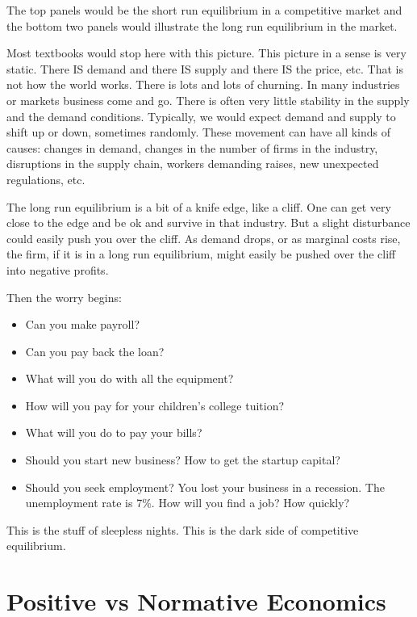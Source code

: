 \documentclass[
]{book}
\begin{document}
The top panels would be the short run equilibrium in a competitive market and the bottom two panels would illustrate the long run equilibrium in the market.

Most textbooks would stop here with this picture. This picture in a sense is very static. There IS demand and there IS supply and there IS the price, etc. That is not how the world works. There is lots and lots of churning. In many industries or markets business come and go. There is often very little stability in the supply and the demand conditions. Typically, we would expect demand and supply to shift up or down, sometimes randomly. These movement can have all kinds of causes: changes in demand, changes in the number of firms in the industry, disruptions in the supply chain, workers demanding raises, new unexpected regulations, etc.

The long run equilibrium is a bit of a knife edge, like a cliff. One can get very close to the edge and be ok and survive in that industry. But a slight disturbance could easily push you over the cliff. As demand drops, or as marginal costs rise, the firm, if it is in a long run equilibrium, might easily be pushed over the cliff into negative profits.

Then the worry begins:

\begin{itemize}
\item
  Can you make payroll?
\item
  Can you pay back the loan?
\item
  What will you do with all the equipment?
\item
  How will you pay for your children's college tuition?
\item
  What will you do to pay your bills?
\item
  Should you start new business? How to get the startup capital?
\item
  Should you seek employment? You lost your business in a recession. The unemployment rate is 7\%. How will you find a job? How quickly?
\end{itemize}

This is the stuff of sleepless nights. This is the dark side of competitive equilibrium.

\hypertarget{positive-vs-normative-economics}{%
\section{Positive vs Normative Economics}\label{positive-vs-normative-economics}}
\end{document}
